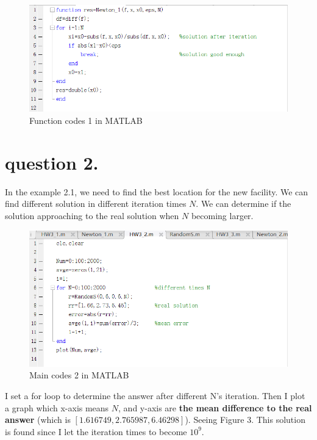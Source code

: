 \documentclass{report}
\begin{document}
\begin{figure}[htbp]
    \centering
    \includegraphics[scale=0.9]{figs/1_3.jpg}
    \caption{Function codes 1 in MATLAB}
\end{figure}

\newpage
\section*{question 2.}
\par In the example 2.1, we need to find the best location for the 
new facility. 
We can find different solution in different iteration times $N$. 
We can determine if the solution approaching to the real solution when $N$ becoming larger.
\par 

\begin{figure}[htbp]
    \centering
    \includegraphics[scale=0.8]{figs/2_1.jpg}
    \caption{Main codes 2 in MATLAB}
\end{figure}

\newpage
\par I set a for loop to determine the answer after different N's iteration. 
Then I plot a graph which x-axis means $N$, and y-axis are 
{\bf the mean difference to the real answer} (which is $[1.616749,2.765987,6.46298]$). Seeing Figure 3. 
This solution is found since I let the iteration times to become $10^9$.
\end{document}
